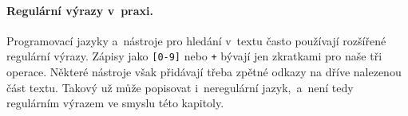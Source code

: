 
\paragraph{Regulární výrazy v~praxi.}

Programovací jazyky a~nástroje pro hledání v~textu často používají rozšířené regulární výrazy. Zápisy jako \texttt{[0-9]} nebo \texttt{+} bývají jen zkratkami pro naše tři operace. Některé nástroje však přidávají třeba zpětné odkazy na dříve nalezenou část textu. Takový  už může popisovat i~neregulární jazyk,~a~není tedy regulárním výrazem ve smyslu této kapitoly.

